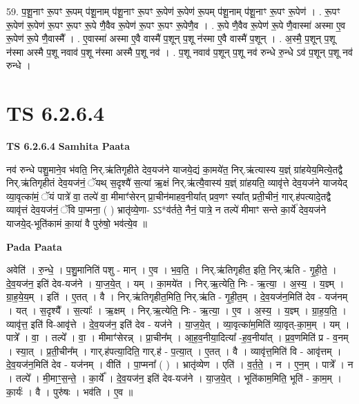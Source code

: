 \documentclass[17pt]{extarticle}
\begin{document}
59. प॒शू॒नाꣳ रू॒पꣳ रू॒पम् प॑शू॒नाम् प॑शू॒नाꣳ रू॒पꣳ रू॒पेण॑ रू॒पेण॑ रू॒पम् प॑शू॒नाम् प॑शू॒नाꣳ रू॒पꣳ रू॒पेण॑ । . रू॒पꣳ रू॒पेण॑ रू॒पेण॑ रू॒पꣳ रू॒पꣳ रू॒पे णै॒वैव रू॒पेण॑ रू॒पꣳ रू॒पꣳ रू॒पेणै॒व । . रू॒पे णै॒वैव रू॒पेण॑ रू॒पे णै॒वास्मा॑ अस्मा ए॒व रू॒पेण॑ रू॒पे णै॒वास्मै᳚ । . ए॒वास्मा॑ अस्मा ए॒वै वास्मै॑ प॒शून् प॒शू न॑स्मा ए॒वै वास्मै॑ प॒शून् । . अ॒स्मै॒ प॒शून् प॒शू न॑स्मा अस्मै प॒शू नवाव॑ प॒शू न॑स्मा अस्मै प॒शू नव॑ । . प॒शू नवाव॑ प॒शून् प॒शू नव॑ रुन्धे रु॒न्धे ऽव॑ प॒शून् प॒शू नव॑ रुन्धे । \newline
\pagebreak
{}

\section{ TS 6.2.6.4 }

\textbf{TS 6.2.6.4 } \newline
\textbf{Samhita Paata} \newline

नव॑ रुन्धे पशु॒माने॒व भ॑वति॒ निर्.ऋ॑तिगृहीते देव॒यज॑ने याजये॒द्यं का॒मये॑त॒ निर्.ऋ॑त्यास्य य॒ज्ञ्ं ग्रा॑हयेय॒मित्ये॒तद्वै निर्.ऋ॑तिगृहीतं देव॒यज॑नं॒ ॅयथ् स॒दृश्यै॑ स॒त्या॑ ऋ॒क्षं निर्.ऋ॑त्यै॒वास्य॑ य॒ज्ञ्ं ग्रा॑हयति॒ व्यावृ॑त्ते देव॒यज॑ने याजयेद् व्या॒वृत्का॑मं॒ ॅयं पात्रे॑ वा॒ तल्पे॑ वा॒ मीमाꣳ॑सेरन् प्रा॒चीन॑माहव॒नीया᳚त् प्रव॒णꣳ स्या᳚त् प्रती॒चीनं॒ गार्.ह॑पत्यादे॒तद्वै व्यावृ॑त्तं देव॒यज॑नं॒ ॅवि पा॒प्मना॒ ( ) भ्रातृ॑व्ये॒णा- ऽऽ*व॑र्तते॒ नैनं॒ पात्रे॒ न तल्पे॑ मीमाꣳ सन्ते का॒र्ये॑ देव॒यज॑ने याजये॒द्-भूति॑कामं का॒या॑ वै पुरु॑षो॒ भव॑त्ये॒व ॥ \newline

\textbf{Pada Paata} \newline

अवेति॑ । रु॒न्धे॒ । प॒शु॒मानिति॑ पशु - मान् । ए॒व । भ॒व॒ति॒ । निर्.ऋ॑तिगृहीत॒ इति॒ निर्.ऋ॑ति - गृ॒ही॒ते॒ । दे॒व॒यज॑न॒ इति॑ देव-यज॑ने । या॒ज॒ये॒त् । यम् । का॒मये॑त । निर्.ऋ॒त्येति॒ निः - ऋ॒त्या॒ । अ॒स्य॒ । य॒ज्ञ्म् । ग्रा॒ह॒ये॒य॒म् । इति॑ । ए॒तत् । वै । निर्.ऋ॑तिगृहीत॒मिति॒ निर्.ऋ॑ति - गृ॒ही॒त॒म् । दे॒व॒यज॑न॒मिति॑ देव - यज॑नम् । यत् । स॒दृश्यै᳚ । स॒त्याः᳚ । ऋ॒क्षम् । निर्.ऋ॒त्येति॒ निः - ऋ॒त्या॒ । ए॒व । अ॒स्य॒ । य॒ज्ञ्म् । ग्रा॒ह॒य॒ति॒ । व्यावृ॑त्त॒ इति॑ वि-आवृ॑त्ते । दे॒व॒यज॑न॒ इति॑ देव - यज॑ने । या॒ज॒ये॒त् । व्या॒वृत्का॑म॒मिति॑ व्या॒वृत्-का॒म॒म् । यम् । पात्रे᳚ । वा॒ । तल्पे᳚ । वा॒ । मीमाꣳ॑सेरन्न् । प्रा॒चीन᳚म् । आ॒ह॒व॒नीया॒दित्या᳚ -ह॒व॒नीया᳚त् । प्र॒व॒णमिति॑ प्र - व॒नम् । स्या॒त् । प्र॒ती॒चीन᳚म् । गार्.ह॑पत्या॒दिति॒ गार्.ह॑ - प॒त्या॒त् । ए॒तत् । वै । व्यावृ॑त्त॒मिति॑ वि - आवृ॑त्तम् । दे॒व॒यज॑न॒मिति॑ देव - यज॑नम् । वीति॑ । पा॒प्मना᳚ ( ) । भ्रातृ॑व्येण । एति॑ । व॒र्त॒ते॒ । न । ए॒न॒म् । पात्रे᳚ । न । तल्पे᳚ । मी॒माꣳ॒॒स॒न्ते॒ । का॒र्ये᳚ । दे॒व॒यज॑न॒ इति॑ देव-यज॑ने । या॒ज॒ये॒त् । भूति॑काम॒मिति॒ भूति॑ - का॒म॒म् । का॒र्यः॑ । वै । पुरु॑षः । भव॑ति । ए॒व ॥  \newline
\end{document}
